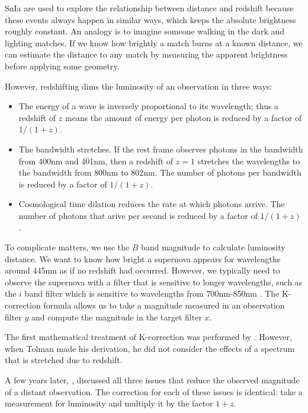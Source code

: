 \documentclass[linenumbers]{aastex631}
\begin{document}
SnIa are used to explore the relationship between distance and redshift because
these events always happen in similar ways, which keeps the absolute brightness
roughly constant. An analogy is to imagine someone walking in the dark and
lighting matches. If we know how brightly a match burns at a known distance, we
can estimate the distance to any match by measuring the apparent brightness
before applying some geometry.

However, redshifting dims the luminosity of an observation in three ways:

\begin{itemize}
  \item The energy of a wave is inversely proportional to its wavelength; thus a
  redshift of $z$ means the amount of energy per photon is reduced by a factor
  of $1 / (1+z)$.

  \item The bandwidth stretches. If the rest frame observes photons in the
  bandwidth from 400nm and 401nm, then a redshift of $z = 1$ stretches the
  wavelengths to the bandwidth from 800nm to 802nm. The number of photons per
  bandwidth is reduced by a factor of $1 / (1+z)$.

  \item Cosmological time dilation reduces the rate at which photons arrive.
  The number of photons that arive per second is reduced by a factor of $1 / (1+z)$.
\end{itemize}

To complicate matters, we use the $B$ band magnitude to calculate luminosity
distance. We want to know how bright a supernova appears for wavelengths around
445nm as if no redshift had occurred. However, we typically need to observe the
supernova with a filter that is sensitive to longer wavelengths, such as the
$i$ band filter which is sensitive to wavelengths from 700nm-850nm
\citep{flaugher2015}. The K-correction formula allows us to take a magnitude
measured in an observation filter $y$ and compute the magnitude in the target
filter $x$.

The first mathematical treatment of K-correction was performed by
\citet{tolman1930}. However, when Tolman made his derivation, he did not
consider the effects of a spectrum that is stretched due to redshift.

A few years later, \citet{desitter1934}, discussed all three issues that reduce
the observed magnitude of a distant observation. The correction for each of
these issues is identical: take a measurement for luminosity and multiply it by
the factor $1 + z$.
\end{document}
